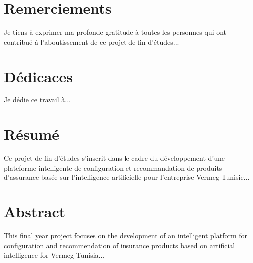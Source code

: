 \documentclass[12pt,a4paper]{report}
\begin{document}
\chapter*{Remerciements}

Je tiens à exprimer ma profonde gratitude à toutes les personnes qui ont contribué à l'aboutissement de ce projet de fin d'études...

\chapter*{Dédicaces}

Je dédie ce travail à...

\chapter*{Résumé}

Ce projet de fin d'études s'inscrit dans le cadre du développement d'une plateforme intelligente de configuration et recommandation de produits d'assurance basée sur l'intelligence artificielle pour l'entreprise Vermeg Tunisie...

\chapter*{Abstract}

This final year project focuses on the development of an intelligent platform for configuration and recommendation of insurance products based on artificial intelligence for Vermeg Tunisia...

\tableofcontents
\end{document}
